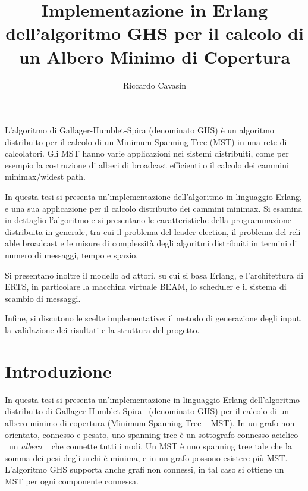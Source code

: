 \documentclass[target=bach,aauheader=,style=]{thud}
\title{Implementazione in Erlang dell'algoritmo GHS per il calcolo di un Albero Minimo di Copertura}
\author{Riccardo Cavasin}
\newcommand{\eng}[1]{\foreignlanguage{english}{#1}}
\begin{document}
\maketitle


\abstract

L'algoritmo di Gallager-Humblet-Spira (denominato GHS) è un algoritmo distribuito per il calcolo di un \eng{Minimum Spanning Tree} (MST) in una rete di calcolatori. Gli MST hanno varie applicazioni nei sistemi distribuiti, come per esempio la costruzione di alberi di \eng{broadcast} efficienti o il calcolo dei cammini minimax/\eng{widest path}.

In questa tesi si presenta un'implementazione dell'algoritmo in linguaggio Erlang, e una sua applicazione per il calcolo distribuito dei cammini minimax. Si esamina in dettaglio l'algoritmo e si presentano le caratteristiche della programmazione distribuita in generale, tra cui il problema del leader \eng{election}, il problema del \eng{reliable broadcast} e le misure di complessità degli algoritmi distribuiti in termini di numero di messaggi, tempo e spazio.

Si presentano inoltre il modello ad attori, su cui si basa Erlang, e l'architettura di ERTS, in particolare la macchina virtuale BEAM, lo scheduler e il sistema di scambio di messaggi.

Infine, si discutono le scelte implementative: il metodo di generazione degli \eng{input}, la validazione dei risultati e la struttura del progetto.

\listoftodos

\tableofcontents



\mainmatter

\chapter{Introduzione}

In questa tesi si presenta un'implementazione in linguaggio Erlang dell'algoritmo distribuito di Gallager-Humblet-Spira~\cite{10.1145/357195.357200} (denominato GHS) per il calcolo di un albero minimo di copertura (\eng{Minimum Spanning Tree}~\textendash\,~MST). In un grafo non orientato, connesso e pesato, uno \eng{spanning tree} è un sottografo connesso aciclico \,\textendash\,~un \emph{albero}~\,\textendash\, che connette tutti i nodi. Un MST è uno \eng{spanning tree} tale che la somma dei pesi degli archi è minima, e in un grafo possono esistere più MST. L'algoritmo GHS supporta anche grafi non connessi, in tal caso si ottiene un MST per ogni componente connessa.
\bigskip
\end{document}
